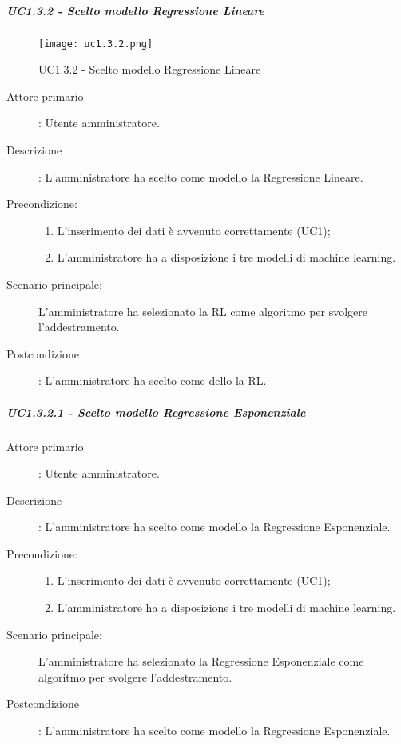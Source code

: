 \newpage

\subparagraph{UC1.3.2 - Scelto modello Regressione Lineare}%
\label{sssec:uc1.3.2}

\begin{figure}[h!]
  \begin{center}
    \texttt{[image: uc1.3.2.png]}\\
    \caption{UC1.3.2 - Scelto modello Regressione Lineare}%
    \label{fig:uc1.3.2}
  \end{center}
  \end{figure}

\begin{description}
  \item[Attore primario]: Utente amministratore.
  \item[Descrizione]: L'amministratore ha scelto come modello la Regressione Lineare.
  \item[Precondizione:]
  \begin{enumerate}
    \item L'inserimento dei dati è avvenuto correttamente (UC1);
    \item L'amministratore ha a disposizione i tre modelli di machine learning.
  \end{enumerate}
  \item[Scenario principale:] L'amministratore ha selezionato la RL come algoritmo per svolgere l'addestramento.
  \item[Postcondizione]: L'amministratore ha scelto come dello la RL.
\end{description}

\subparagraph*{UC1.3.2.1 - Scelto modello Regressione Esponenziale}
\label{sssec:uc1.3.2.1}
\begin{description}
  \item[Attore primario]: Utente amministratore.
  \item[Descrizione]: L'amministratore ha scelto come modello la Regressione Esponenziale.
  \item[Precondizione:]
  \begin{enumerate}
    \item L'inserimento dei dati è avvenuto correttamente (UC1);
    \item L'amministratore ha a disposizione i tre modelli di machine learning.
  \end{enumerate}
  \item[Scenario principale:] L'amministratore ha selezionato la Regressione Esponenziale come algoritmo per svolgere l'addestramento.
  \item[Postcondizione]: L'amministratore ha scelto come modello la Regressione Esponenziale.
\end{description}

